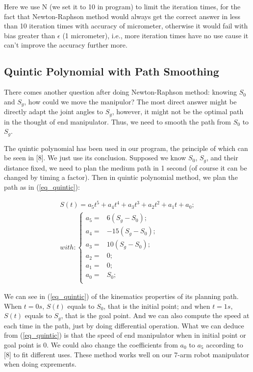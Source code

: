 \documentclass[letterpaper, 10 pt, conference]{ieeeconf}  %
\begin{document}
Here we use N (we set it to 10 in program) to limit the iteration times, for the fact that Newton-Raphson method would always get the correct answer in less than 10 iteration times with accuracy of micrometer, otherwise it would fail with bias greater than $\epsilon$ (1 micrometer), i.e., more iteration times have no use cause it can't improve the accuracy further more.

\subsection{Quintic Polynomial with Path Smoothing}

There comes another question after doing Newton-Raphson method: knowing $S_{0}$ and $S_{g}$, how could we move the manipulor? The most direct answer might be directly adapt the joint angles to $S_{g}$, however, it might not be the optimal path in the thought of end manipulator. Thus, we need to smooth the path from $S_{0}$ to $S_{g}$.

The quintic polynomial has been used in our program, the principle of which can be seen in [8]. We just use its conclusion. Supposed we know $S_{0}$, $S_{g}$, and their distance fixed, we need to plan the medium path in 1 second (of course it can be changed by timing a factor). Then in quintic polynomial method, we plan the path as in (\ref{eq_quintic}):

\begin{equation}
\begin{array}{c}
S(t) = a_{5}t^5+a_{4}t^4+a_{3}t^3+a_{2}t^2+a_{1}t+a_{0};\\
with:
\left \{
\begin{array}{ll}
a_{5} = &6(S_{g}-S_{0});\\
a_{4} = &-15(S_{g}-S_{0});\\
a_{3} = &10(S_{g}-S_{0});\\
a_{2} = &0;\\
a_{1} = &0;\\
a_{0} = &S_{0};\\
\end{array}
\right.
\end{array}
\label{eq_quintic}
\end{equation}

We can see in (\ref{eq_quintic}) of the kinematics properties of its planning path. When $t = 0s$, $S(t)$ equals to $S_{0}$, that is the initial point;  and when $t = 1s$, $S(t)$ equals to $S_{g}$, that is the goal point. And we can also compute the speed at each time in the path, just by doing differential operation. What we can deduce from (\ref{eq_quintic}) is that the speed of end manipulator when in initial point or goal point is 0. We could also change the coefficients from $a_{0}$ to $a_{5}$ according to [8] to fit different uses. These method works well on our 7-arm robot manipulator when doing exprements.
\end{document}
